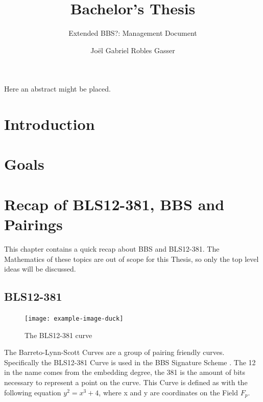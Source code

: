 \documentclass[
	a4paper               %
	,bibliography=totoc   %
	,listof=totoc         %
	,monolingual
]{bfhthesis}              %
\begin{document}
\frontmatter

\title{Bachelor's Thesis}
\subtitle{Extended BBS?: Management Document}
\author{Joël Gabriel Robles Gasser}

\maketitle

Here an abstract might be placed.


\tableofcontents

\mainmatter

\chapter{Introduction}

\chapter{Goals}

\chapter{Recap of BLS12-381, BBS and Pairings}
This chapter contains a quick recap about BBS and BLS12-381.
The Mathematics of these topics are out of scope for this Thesis, so only the top level ideas will be discussed.

\section{BLS12-381}
\begin{figure}[h]
    \centering
	\texttt{[image: example-image-duck]}
	\caption{The BLS12-381 curve}
	\label{fig:bls12381}
\end{figure}
The Barreto-Lynn-Scott Curves \cite{pairing-friendly-curves} are a group of pairing friendly curves. 
Specifically the BLS12-381 Curve is used in the BBS Signature Scheme \cite{bbs-signature-scheme}.
The 12 in the name comes from the embedding degree, the 381 is the amount of bits necessary to represent a point on the curve.
This Curve is defined as with the following equation $y^2 = x^3 + 4$, where x and y are coordinates on the Field $F_p$.
\end{document}
